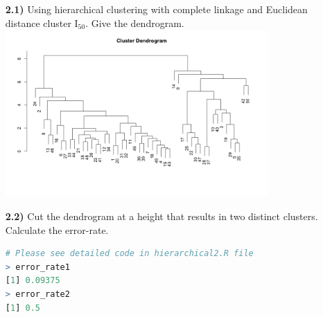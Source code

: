 \documentclass{article}
\begin{document}
 \begin{enumerate}
  \item[\textbf{2.1)}]  Using hierarchical clustering with complete linkage and Euclidean distance cluster $\text{I}_{50}$. Give the dendrogram.
\\ 
 \includegraphics[width=10cm]{2-1.png}
 
\item[\textbf{2.2)}] Cut the dendrogram at a height that results in two distinct  clusters. Calculate the error-rate.
\\  

\begin{lstlisting}[language=R]
# Please see detailed code in hierarchical2.R file
> error_rate1
[1] 0.09375
> error_rate2
[1] 0.5
\end{lstlisting}


\end{enumerate}
\end{document}
